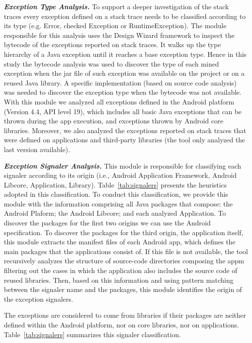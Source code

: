 \emph{\textbf{Exception Type Analysis.}} To support a deeper investigation of the 
stack traces every exception defined on a stack trace needs to be classified according to its type
(e.g. Error, checked Exception or RuntimeException). The module responsible for this analysis 
uses the Design Wizard framework \cite{Brunet09} to inspect the bytecode of the exceptions reported 
on stack traces.  It walks up the type hierarchy of a Java exception until it reaches 
a base exception type. Hence in this study the bytecode analysis was used to discover the type 
of each mined exception when the jar file of such exception was available on the project or 
on a reused  Java library. A specific implementation (based on source code analysis)
 was needed to discover the exception type when the bytecode was not available.
With this module we analyzed all exceptions defined in the Android platform (Version 4.4, API level 19),
which includes all basic Java exceptions that can be thrown during the app execution,
and exceptions thrown by Android core libraries. Moreover, we also analyzed the 
exceptions reported on stack traces that were defined on applications and third-party libraries 
(the tool only analyzed the last version available).

\emph{\textbf{Exception Signaler Analysis.}}
This module is responsible for classifying each signaler according 
to its origin (i.e., Android Application Framework, Android Libcore, Application, Library). 
Table~\ref{tab:signalers} presents the heuristics adopted in this classification.
To conduct this classification, we provide this module with the information
comprising all Java packages that compose: the Android Plaform;
 the Android Libcore; and each analyzed Application. To discover the packages for the first two origins
we can use the Android specification.
To discover the packages for the third origin, the application itself, this module
extracts the manifest files of each Android app, which defines the main packages that the applications consist of.
 If this file is not available, the tool recursively analyzes the 
structure of source-code directories composing the appm filtering out the cases in which the application also includes the source code of reused libraries.
Then, based on this information and using pattern matching 
between the signaler name and the packages, this module identifies 
the origin of the exception signalers. 

The exceptions are considered to come
 from libraries if their packages are neither defined 
within the Android platform, nor on core libraries, nor on applications.
Table~\ref{tab:signalers} summarizes this signaler classification.


